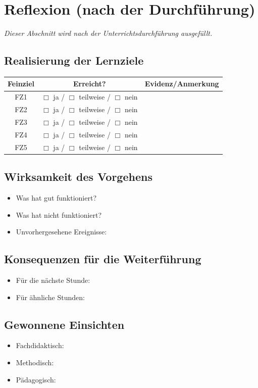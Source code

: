 \documentclass[11pt,a4paper]{article}
\begin{document}
\section{Reflexion (nach der Durchführung)}

\textit{Dieser Abschnitt wird nach der Unterrichtsdurchführung ausgefüllt.}

\subsection{Realisierung der Lernziele}
\begin{tabular}{|c|c|l|}
\hline
\textbf{Feinziel} & \textbf{Erreicht?} & \textbf{Evidenz/Anmerkung} \\
\hline
FZ1 & $\Box$ ja / $\Box$ teilweise / $\Box$ nein & \\
\hline
FZ2 & $\Box$ ja / $\Box$ teilweise / $\Box$ nein & \\
\hline
FZ3 & $\Box$ ja / $\Box$ teilweise / $\Box$ nein & \\
\hline
FZ4 & $\Box$ ja / $\Box$ teilweise / $\Box$ nein & \\
\hline
FZ5 & $\Box$ ja / $\Box$ teilweise / $\Box$ nein & \\
\hline
\end{tabular}

\subsection{Wirksamkeit des Vorgehens}
\begin{itemize}
    \item Was hat gut funktioniert?
    \item Was hat nicht funktioniert?
    \item Unvorhergesehene Ereignisse:
\end{itemize}

\subsection{Konsequenzen für die Weiterführung}
\begin{itemize}
    \item Für die nächste Stunde:
    \item Für ähnliche Stunden:
\end{itemize}

\subsection{Gewonnene Einsichten}
\begin{itemize}
    \item Fachdidaktisch:
    \item Methodisch:
    \item Pädagogisch:
\end{itemize}
\end{document}
